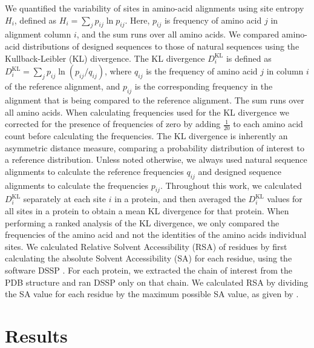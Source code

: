 \documentclass[12pt]{article}
\begin{document}
We quantified the variability of sites in amino-acid alignments using site entropy $H_i$, defined as $H_i=\sum_{j}p_{ij}\ln p_{ij}$. Here, $p_{ij}$ is frequency of amino acid $j$ in alignment column $i$, and the sum runs over all amino acids. We compared amino-acid distributions of designed sequences to those of natural sequences using the Kullback-Leibler (KL) divergence. The KL divergence $D^\text{KL}_i$ is defined as $D^\text{KL}_i= \sum_j  p_{ij} \ln  (p_{ij}/q_{ij})$, where $q_{ij}$ is the frequency of amino acid $j$ in column $i$ of the reference alignment, and $p_{ij}$ is the corresponding frequency in the alignment that is being compared to the reference alignment. The sum runs over all amino acids.  When calculating frequencies used for the KL divergence we corrected for the presence of frequencies of zero by adding  $\frac{1}{20}$ to each amino acid count before calculating the frequencies. The KL divergence is inherently an asymmetric distance measure, comparing a probability distribution of interest to a reference distribution. Unless noted otherwise, we always used natural sequence alignments to calculate the reference frequencies $q_{ij}$ and designed sequence alignments to calculate the frequencies $p_{ij}$. Throughout this work, we calculated $D^\text{KL}_i$ separately at each site $i$ in a protein, and then averaged the $D^\text{KL}_i$ values for all sites in a protein to obtain a mean KL divergence for that protein. When performing a ranked analysis of the KL divergence, we only compared the frequencies of the amino acid and not the identities of the amino acids individual sites.  We calculated Relative Solvent Accessibility (RSA) of residues by first calculating the absolute Solvent Accessibility (SA) for each residue, using the software DSSP \citep{Kabsch1983}. For each protein, we extracted the chain of interest from the PDB structure and ran DSSP only on that chain. We calculated RSA by dividing the SA value for each residue by the maximum possible SA value, as given by \citet{Tien}. 

\section{Results}
\label{Results}
\end{document}
